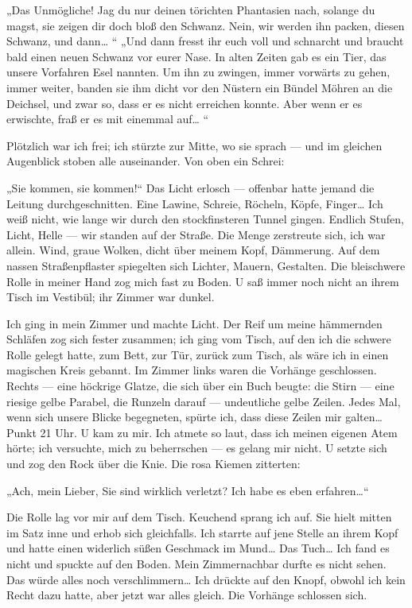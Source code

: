 „Das Unmögliche! Jag du nur deinen törichten Phantasien nach,
solange du magst, sie zeigen dir doch bloß den Schwanz. Nein, wir
werden ihn packen, diesen Schwanz, und dann\ldots{} “ „Und dann fresst
ihr euch voll und schnarcht und braucht
bald einen neuen Schwanz vor eurer Nase. In alten Zeiten gab es ein
Tier, das unsere Vorfahren Esel nannten. Um ihn zu zwingen, immer
vorwärts zu gehen, immer weiter, banden sie ihm dicht vor den
Nüstern ein Bündel Möhren an die Deichsel, und zwar so, dass er es
nicht erreichen konnte. Aber wenn er es erwischte, fraß er es mit
einemmal auf\ldots{} “

Plötzlich war ich frei; ich stürzte zur Mitte, wo sie sprach — und
im gleichen Augenblick stoben alle auseinander. Von oben ein
Schrei:

„Sie kommen, sie kommen!“ Das Licht erlosch — offenbar hatte jemand
die Leitung durchgeschnitten. Eine Lawine, Schreie, Röcheln, Köpfe,
Finger\ldots{} Ich weiß nicht, wie lange wir durch den stockfinsteren
Tunnel gingen. Endlich Stufen, Licht, Helle — wir standen auf der
Straße. Die Menge zerstreute sich, ich war allein. Wind, graue
Wolken, dicht über meinem Kopf, Dämmerung. Auf dem nassen
Straßenpflaster spiegelten sich Lichter, Mauern, Gestalten. Die
bleischwere Rolle in meiner Hand zog mich fast zu Boden. U saß
immer noch nicht an ihrem Tisch im Vestibül; ihr Zimmer war
dunkel.

Ich ging in mein Zimmer und machte Licht. Der Reif um meine
hämmernden Schläfen zog sich fester zusammen; ich ging vom Tisch,
auf den ich die schwere Rolle gelegt hatte, zum Bett, zur Tür,
zurück zum Tisch, als wäre ich in einen magischen Kreis gebannt. Im
Zimmer links waren die Vorhänge geschlossen. Rechts — eine höckrige
Glatze, die sich über ein Buch beugte: die Stirn — eine riesige
gelbe Parabel, die Runzeln darauf — undeutliche gelbe Zeilen. Jedes
Mal, wenn sich unsere Blicke begegneten, spürte ich, dass diese
Zeilen mir galten\ldots{} Punkt 21 Uhr. U kam zu mir. Ich atmete so
laut, dass ich meinen eigenen Atem hörte; ich versuchte, mich zu
beherrschen — es gelang mir nicht. U setzte sich und zog den Rock
über die Knie. Die rosa Kiemen zitterten:

„Ach, mein Lieber, Sie sind wirklich verletzt? Ich habe es eben
erfahren\ldots{}“

Die Rolle lag vor mir auf dem Tisch. Keuchend sprang ich auf. Sie
hielt mitten im Satz inne und erhob sich gleichfalls. Ich starrte
auf jene Stelle an ihrem Kopf und hatte einen widerlich süßen
Geschmack im Mund\ldots{} Das Tuch\ldots{} Ich fand es nicht und spuckte auf
den Boden. Mein Zimmernachbar durfte es nicht sehen. Das würde
alles noch verschlimmern\ldots{} Ich drückte auf den Knopf, obwohl ich
kein Recht dazu hatte, aber jetzt war alles gleich. Die Vorhänge
schlossen sich.

